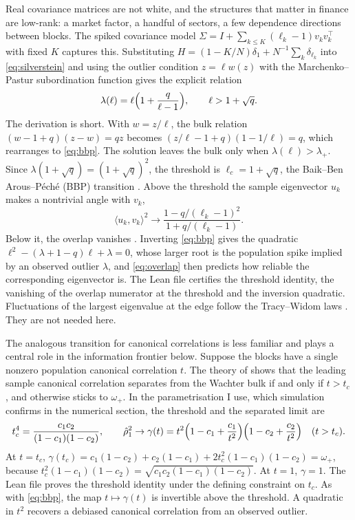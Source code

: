 Real covariance matrices are not white, and the structures that matter in finance are low-rank: a market factor, a handful of sectors, a few dependence directions between blocks. The spiked covariance model $\Sigma=I+\sum_{k\leq K}(\ell_k-1)v_kv_k^\top$ with fixed $K$ captures this. Substituting $H=(1-K/N)\delta_1+N^{-1}\sum_k\delta_{\ell_k}$ into \eqref{eq:silverstein} and using the outlier condition $z=\ell w(z)$ with the Marchenko--Pastur subordination function gives the explicit relation
\begin{equation}
 \lambda(\ell)=\ell\Bigl(1+\frac q{\ell-1}\Bigr),\qquad\ell>1+\sqrt q.
 \label{eq:bbp}
\end{equation}
The derivation is short. With $w=z/\ell$, the bulk relation $(w-1+q)(z-w)=qz$ becomes $(z/\ell-1+q)(1-1/\ell)=q$, which rearranges to \eqref{eq:bbp}. The solution leaves the bulk only when $\lambda(\ell)>\lambda_+$. Since $\lambda(1+\sqrt q)=(1+\sqrt q)^2$, the threshold is $\ell_c=1+\sqrt q$, the Baik--Ben Arous--P\'ech\'e (BBP) transition \citep{baik2005phase,baik2006eigenvalues}. Above the threshold the sample eigenvector $u_k$ makes a nontrivial angle with $v_k$,
\begin{equation}
 \langle u_k,v_k\rangle^2\to\frac{1-q/(\ell_k-1)^2}{1+q/(\ell_k-1)}.
 \label{eq:overlap}
\end{equation}
Below it, the overlap vanishes \citep{paul2007asymptotics,benaych2011eigenvalues,bloemendal2016principal}. Inverting \eqref{eq:bbp} gives the quadratic $\ell^2-(\lambda+1-q)\ell+\lambda=0$, whose larger root is the population spike implied by an observed outlier $\lambda$, and \eqref{eq:overlap} then predicts how reliable the corresponding eigenvector is. The Lean file certifies the threshold identity, the vanishing of the overlap numerator at the threshold and the inversion quadratic. Fluctuations of the largest eigenvalue at the edge follow the Tracy--Widom laws \citep{tracy1994level,tracy1996orthogonal,johnstone2001distribution}. They are not needed here.

The analogous transition for canonical correlations is less familiar and plays a central role in the information frontier below. Suppose the blocks have a single nonzero population canonical correlation $t$. The theory of \citet{bao2019canonical} shows that the leading sample canonical correlation separates from the Wachter bulk if and only if $t>t_c$, and otherwise sticks to $\omega_+$. In the parametrisation I use, which simulation confirms in the numerical section, the threshold and the separated limit are
\begin{equation}
 t_c^4=\frac{c_1c_2}{(1-c_1)(1-c_2)},\qquad
 \hat\rho_1^2\to\gamma(t)=t^2\Bigl(1-c_1+\frac{c_1}{t^2}\Bigr)\Bigl(1-c_2+\frac{c_2}{t^2}\Bigr)\quad(t>t_c).
 \label{eq:cca-spike}
\end{equation}
At $t=t_c$, $\gamma(t_c)=c_1(1-c_2)+c_2(1-c_1)+2t_c^2(1-c_1)(1-c_2)=\omega_+$, because $t_c^2(1-c_1)(1-c_2)=\sqrt{c_1c_2(1-c_1)(1-c_2)}$. At $t=1$, $\gamma=1$. The Lean file proves the threshold identity under the defining constraint on $t_c$. As with \eqref{eq:bbp}, the map $t\mapsto\gamma(t)$ is invertible above the threshold. A quadratic in $t^2$ recovers a debiased canonical correlation from an observed outlier.

